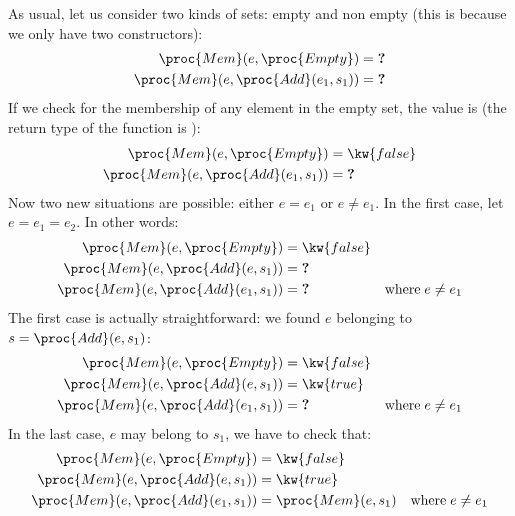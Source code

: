    As usual, let us consider two kinds of sets: empty and non empty
   (this is because we only have two constructors):
   \begin{align}
      \proc{Mem} (e, \proc{Empty}) 
   &= \textbf{?}\\
      \proc{Mem} (e, \proc{Add} (e_1, s_1))
   &= \textbf{?}
   \end{align}
   If we check for the membership of any element in the empty set, the
   value is  (the return type of the function is
   ):
   \begin{align*}
      \proc{Mem} (e, \proc{Empty}) 
   &= \kw{false}\\
      \proc{Mem} (e, \proc{Add} (e_1, s_1))
   &= \textbf{?}
   \end{align*}
   Now two new situations are possible: either \(e = e_1\)
   or \(e \neq e_1\). In the first case, let \(e =
   e_1 = e_2\). In other words:
   \begin{align*}
      \proc{Mem} (e, \proc{Empty}) 
   &= \kw{false}\\
      \proc{Mem} (e, \proc{Add} (e, s_1))
   &= \textbf{?}\\
      \proc{Mem} (e, \proc{Add} (e_1, s_1))
   &= \textbf{?} & \text{where} \; e \neq e_1
   \end{align*}
   The first case is actually straightforward: we found \(e\)
   belonging to \(s = \proc{Add} (e, s_1)\):
   \begin{align*}
      \proc{Mem} (e, \proc{Empty}) 
   &= \kw{false}\\
      \proc{Mem} (e, \proc{Add} (e, s_1))
   &= \kw{true}\\
      \proc{Mem} (e, \proc{Add} (e_1, s_1))
   &= \textbf{?} & \text{where} \; e \neq e_1
   \end{align*}
   In the last case, \(e\) may belong to \(s_1\), we have to check
   that:
   \begin{align*}
      \proc{Mem} (e, \proc{Empty}) 
   &= \kw{false}\\
      \proc{Mem} (e, \proc{Add} (e, s_1))
   &= \kw{true}\\
      \proc{Mem} (e, \proc{Add} (e_1, s_1))
   &= \proc{Mem} (e, s_1) & \text{where} \; e \neq e_1
   \end{align*}

